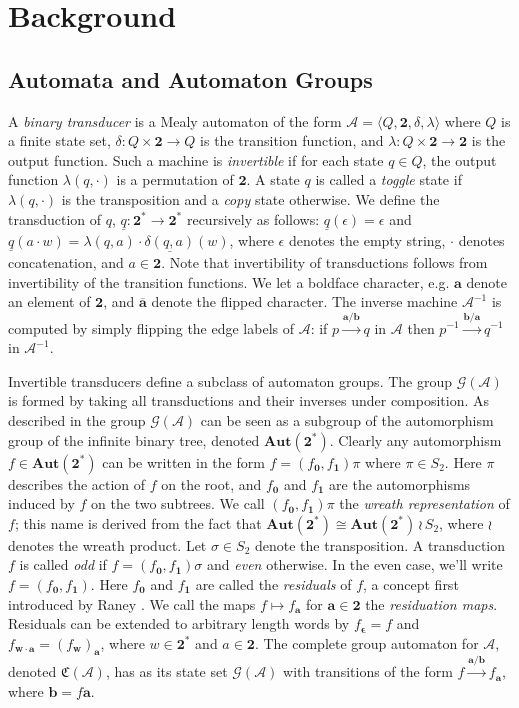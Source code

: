 \documentclass[12pt, letterpaper]{article}
\newcommand{\bin}{\mathbf 2}
\newcommand{\A}{\mathcal A}
\newcommand{\ch}[1]{\mathbf{#1}}
\newcommand{\res}[2]{{{#1}_{\ch{#2}}}}
\newcommand{\comp}{\mathfrak C}
\newcommand{\Aut}{\mathbf{Aut}}
\newcommand{\gp}{\mathcal G}
\newcommand{\f}[1]{\overline{#1}}
\begin{document}
\section{Background}
\subsection{Automata and Automaton Groups}
A \emph{binary transducer} is a Mealy automaton of the form $\A = \langle Q,
\bin, \delta, \lambda \rangle$ where $Q$ is a finite state set, $\delta: Q
\times \bin \rightarrow Q$ is the transition function, and $\lambda: Q \times
\bin \rightarrow \bin$ is the output function. Such a machine is
\emph{invertible} if for each state $q \in Q$, the output function $\lambda(q,
\cdot)$ is a permutation of $\bin$. A state $q$ is called a \emph{toggle} state
if $\lambda(q, \cdot)$ is the transposition and a \emph{copy} state otherwise.
We define the transduction of $q$, $\underline{q}: \bin^* \rightarrow \bin^*$
recursively as follows: $\underline{q}(\epsilon) = \epsilon$ and
$\underline{q}(a \cdot w) = \lambda(q, a) \cdot \underline{\delta(q, a)}(w)$,
where $\epsilon$ denotes the empty string, $\cdot$ denotes concatenation, and
$a \in \bin$. Note that invertibility of transductions follows from
invertibility of the transition functions. We let a boldface character, e.g.
$\ch{a}$ denote an element of $\bin$, and $\f{\ch{a}}$ denote the flipped
character. The inverse machine $\A^{-1}$ is computed by simply flipping the
edge labels of $\A$: if $p \xrightarrow{\ch{a} / \ch{b}} q$ in $\A$ then
$p^{-1} \xrightarrow{\ch{b} / \ch{a}} q^{-1}$ in $\A^{-1}$.

Invertible transducers define a subclass of automaton groups. The group
$\gp(\A)$ is formed by taking all transductions and their inverses under
composition.  As described in \cite{jalc170214} the group $\gp(\A)$ can be seen
as a subgroup of the automorphism group of the infinite binary tree, denoted
$\Aut(\bin^*)$.  Clearly any automorphism $f \in \Aut(\bin^*)$ can be written
in the form $f = (\res{f}{0}, \res{f}{1})\pi$ where $\pi \in S_2$. Here $\pi$
describes the action of $f$ on the root, and $\res{f}{0}$ and $\res{f}{1}$ are
the automorphisms induced by $f$ on the two subtrees. We call $(\res{f}{0},
\res{f}{1})\pi$ the \emph{wreath representation} of $f$; this name is derived
from the fact that $\Aut(\bin^*) \cong \Aut(\bin^*) \, \wr \, S_2$, where $\wr$
denotes the wreath product. Let $\sigma \in S_2$ denote the transposition. A
transduction $f$ is called \emph{odd} if $f = (\res{f}{0}, \res{f}{1}) \sigma$
and \emph{even} otherwise. In the even case, we'll write $f = (\res{f}{0},
\res{f}{1})$. Here $\res{f}{0}$ and $\res{f}{1}$ are called the
\emph{residuals} of $f$, a concept first introduced by Raney
\cite{raney1958sequential}. We call the maps $f \mapsto \res{f}{a}$ for $\ch{a}
\in \bin$ the \emph{residuation maps}. Residuals can be extended to arbitrary
length words by $\res{f}{\epsilon} = f$ and $\res{f}{w \cdot a} =
\res{(\res{f}{w})}{a}$, where $w \in \bin^*$ and $a \in \bin$. The complete
group automaton for $\A$, denoted $\comp(\A)$, has as its state set $\gp(\A)$
with transitions of the form $f \xrightarrow{\ch{a} / \ch{b}} \res{f}{a}$,
where $\ch{b} = f \ch{a}$.
\end{document}
